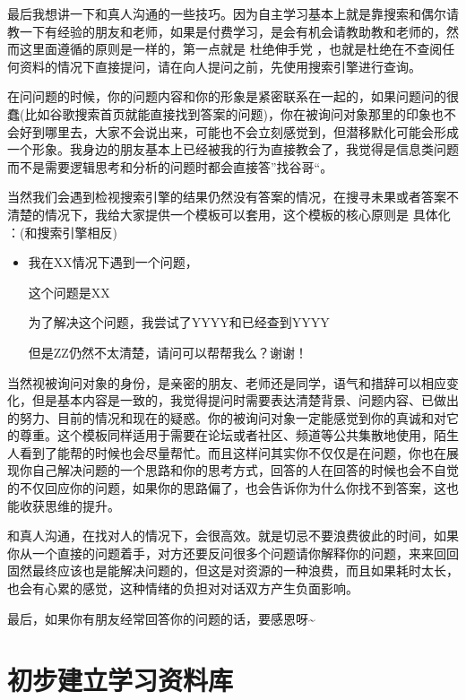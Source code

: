 \documentclass[
]{book}
\begin{document}
最后我想讲一下和真人沟通的一些技巧。因为自主学习基本上就是靠搜索和偶尔请教一下有经验的朋友和老师，如果是付费学习，是会有机会请教助教和老师的，然而这里面遵循的原则是一样的，第一点就是 杜绝伸手党 ，也就是杜绝在不查阅任何资料的情况下直接提问，请在向人提问之前，先使用搜索引擎进行查询。

在问问题的时候，你的问题内容和你的形象是紧密联系在一起的，如果问题问的很蠢(比如谷歌搜索首页就能直接找到答案的问题)，你在被询问对象那里的印象也不会好到哪里去，大家不会说出来，可能也不会立刻感觉到，但潜移默化可能会形成一个形象。我身边的朋友基本上已经被我的行为直接教会了，我觉得是信息类问题而不是需要逻辑思考和分析的问题时都会直接答''找谷哥``。

当然我们会遇到检视搜索引擎的结果仍然没有答案的情况，在搜寻未果或者答案不清楚的情况下，我给大家提供一个模板可以套用，这个模板的核心原则是 具体化 ：(和搜索引擎相反)

\begin{itemize}
\item
  我在XX情况下遇到一个问题，

  这个问题是XX

  为了解决这个问题，我尝试了YYYY和已经查到YYYY

  但是ZZ仍然不太清楚，请问可以帮帮我么？谢谢！
\end{itemize}

当然视被询问对象的身份，是亲密的朋友、老师还是同学，语气和措辞可以相应变化，但是基本内容是一致的，我觉得提问时需要表达清楚背景、问题内容、已做出的努力、目前的情况和现在的疑惑。你的被询问对象一定能感觉到你的真诚和对它的尊重。这个模板同样适用于需要在论坛或者社区、频道等公共集散地使用，陌生人看到了能帮的时候也会尽量帮忙。而且这样问其实你不仅仅是在问题，你也在展现你自己解决问题的一个思路和你的思考方式，回答的人在回答的时候也会不自觉的不仅回应你的问题，如果你的思路偏了，也会告诉你为什么你找不到答案，这也能收获思维的提升。

和真人沟通，在找对人的情况下，会很高效。就是切忌不要浪费彼此的时间，如果你从一个直接的问题着手，对方还要反问很多个问题请你解释你的问题，来来回回固然最终应该也是能解决问题的，但这是对资源的一种浪费，而且如果耗时太长，也会有心累的感觉，这种情绪的负担对对话双方产生负面影响。

最后，如果你有朋友经常回答你的问题的话，要感恩呀\textasciitilde{}

\hypertarget{ux521dux6b65ux5efaux7acbux5b66ux4e60ux8d44ux6599ux5e93}{%
\chapter{初步建立学习资料库}\label{ux521dux6b65ux5efaux7acbux5b66ux4e60ux8d44ux6599ux5e93}}
\end{document}
